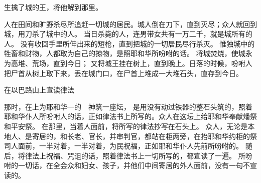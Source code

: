 {生擒了{}城的王，将他解到{}那里。
\par }{\PP {}人在田间和旷野杀尽所追赶一切{}城的居民。{}城人倒在刀下，直到灭尽；{}众人就回到{}城，用刀杀了城中的人。
当日杀毙的人，连男带女共有一万二千，就是{}城所有的人。
没有收回手里所伸出来的短枪，直到把{}城的一切居民尽行杀灭。
惟独城中的牲畜和财物，{}人都取为自己的掠物，是照耶和华所吩咐{}的话。
将{}城焚烧，使城永为高堆、荒场，直到今日；
又将{}城王挂在树上，直到晚上。日落的时候，{}吩咐人把尸首从树上取下来，丢在城门口，在尸首上堆成一大堆石头，直存到今日。
\par }{\SH 在以巴路山上宣读律法
\par }{\PP {}那时，{}在{}上为耶和华—{}的　神筑一座坛，
是用没有动过铁器的整石头筑的，照着耶和华仆人{}所吩咐{}人的话，正如{}律法书上所写的。众人在这坛上给耶和华奉献燔祭和平安祭。
在那里，当着{}人面前，将{}所写的律法抄写在石头上。
众人，无论是本地人、是寄居的，和长老、官长，并审判官，都站在{}柜两旁，在抬耶和华约柜的祭司{}人面前，一半对着{}，一半对着{}，为{}民祝福，正如耶和华仆人{}先前所吩咐的。
随后，{}将律法上祝福、咒诅的话，照着律法书上一切所写的，都宣读了一遍。
所吩咐的一切话，{}在{}全会众和妇女、孩子，并他们中间寄居的外人面前，没有一句不宣读的。

}
